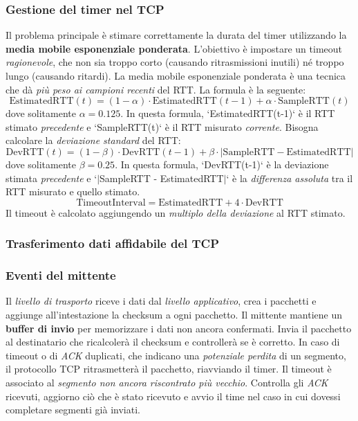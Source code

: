 \subsubsection{Gestione del timer nel TCP}
Il problema principale è stimare correttamente la durata del timer utilizzando la \textbf{media mobile esponenziale ponderata}. L'obiettivo è impostare un timeout \textit{ragionevole}, che non sia troppo corto (causando ritrasmissioni inutili) né troppo lungo (causando ritardi). La media mobile esponenziale ponderata è una tecnica che dà \textit{più peso ai campioni recenti} del RTT. La formula è la seguente:
\[
\text{EstimatedRTT}(t) = (1 - \alpha) \cdot \text{EstimatedRTT}(t-1) + \alpha \cdot \text{SampleRTT}(t)
\]
dove solitamente \(\alpha = 0.125\). In questa formula, `EstimatedRTT(t-1)` è il RTT stimato \textit{precedente} e `SampleRTT(t)` è il RTT misurato \textit{corrente}.
Bisogna calcolare la \textit{deviazione standard} del RTT:
\[
  \text{DevRTT}(t) = (1 - \beta) \cdot \text{DevRTT}(t-1) + \beta \cdot \lvert \text{SampleRTT} - \text{EstimatedRTT}\rvert
\]
dove solitamente \(\beta = 0.25\). In questa formula, `DevRTT(t-1)` è la deviazione stimata \textit{precedente} e `$\lvert$SampleRTT - EstimatedRTT$\rvert$` è la \textit{differenza assoluta} tra il RTT misurato e quello stimato.
\[\text{TimeoutInterval} = \text{EstimatedRTT} + 4 \cdot \text{DevRTT}\]
Il timeout è calcolato aggiungendo un \textit{multiplo della deviazione} al RTT stimato.

\subsubsection{Trasferimento dati affidabile del TCP}
\subsubsection*{Eventi del mittente}
Il \textit{livello di trasporto} riceve i dati dal \textit{livello applicativo}, crea i pacchetti e aggiunge all'intestazione la checksum a ogni pacchetto. Il mittente mantiene un \textbf{buffer di invio} per memorizzare i dati non ancora confermati. Invia il pacchetto al destinatario che ricalcolerà il checksum e controllerà se è corretto.
In caso di timeout o di \textit{ACK} duplicati, che indicano una \textit{potenziale perdita} di un segmento, il protocollo TCP ritrasmetterà il pacchetto, riavviando il timer. Il timeout è associato al \textit{segmento non ancora riscontrato più vecchio}.
Controlla gli \textit{ACK} ricevuti, aggiorno ciò che è stato ricevuto e avvio il time nel caso in cui dovessi completare segmenti già inviati.

